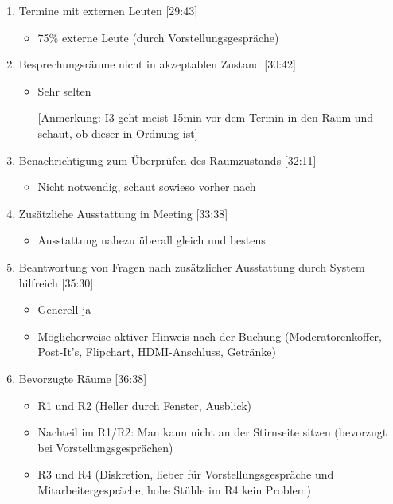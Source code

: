 \begin{enumerate}
        
    \item Termine mit externen Leuten [29:43]
     \begin{itemize}
        \item 75\% externe Leute (durch Vorstellungsgespräche)
    \end{itemize}
    
    \item Besprechungsräume nicht in akzeptablen Zustand [30:42]
     \begin{itemize}
        \item Sehr selten 
        \item[] [Anmerkung: I3 geht meist 15min vor dem Termin in den Raum und schaut, ob dieser in Ordnung ist]
    \end{itemize}

    \item Benachrichtigung zum Überprüfen des Raumzustands [32:11]
     \begin{itemize}
        \item Nicht notwendig, schaut sowieso vorher nach
    \end{itemize}
    
    \item Zusätzliche Ausstattung in Meeting [33:38]
     \begin{itemize}
        \item Ausstattung nahezu überall gleich und bestens
    \end{itemize}

    \item Beantwortung von Fragen nach zusätzlicher Ausstattung durch System hilfreich [35:30]
     \begin{itemize}
        \item Generell ja 
        \item Möglicherweise aktiver Hinweis nach der Buchung (Moderatorenkoffer, Post-It’s, Flipchart, HDMI-Anschluss, Getränke)
    \end{itemize}
        
    \item Bevorzugte Räume [36:38]
     \begin{itemize}
        \item R1 und R2 (Heller durch Fenster, Ausblick)
        \item Nachteil im R1/R2: Man kann nicht an der Stirnseite sitzen (bevorzugt bei Vorstellungsgesprächen)
        \item R3 und R4 (Diskretion, lieber für Vorstellungsgespräche und Mitarbeitergespräche, hohe Stühle im R4 kein Problem)
    \end{itemize}
    

\end{enumerate}
